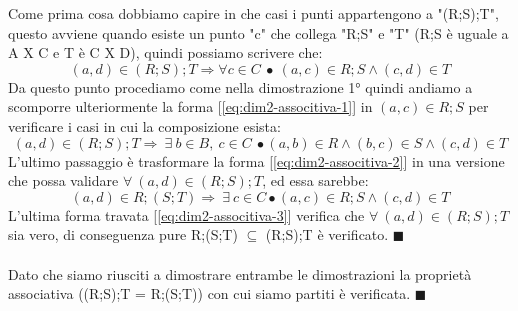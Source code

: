 \begin{demostration}
        Come prima cosa dobbiamo capire in che casi i punti appartengono a "(R;S);T", questo avviene quando esiste un punto "c" che collega "R;S" e "T" (R;S è uguale a A X C e T è C X D), quindi possiamo scrivere che:
        \begin{equation}
            (a,d) \in (R;S);T \Longrightarrow \forall c \in C \: \bullet \: (a,c) \in R;S \land (c,d) \in T
            \label{eq:dim2-associtiva-1}
        \end{equation}
        Da questo punto procediamo come nella dimostrazione 1° quindi andiamo a scomporre ulteriormente la forma [\ref{eq:dim2-associtiva-1}] in $(a,c) \in R;S$ per verificare i casi in cui la composizione esista:
        \begin{equation}
            (a,d) \in (R;S);T \Longrightarrow \: \exists \: b \in B, \: c \in C \: \bullet (a,b) \in R \land (b,c) \in S \land (c,d) \in T
            \label{eq:dim2-associtiva-2}
        \end{equation}
        L'ultimo passaggio è trasformare la forma [\ref{eq:dim2-associtiva-2}] in una versione che possa validare $\forall \: (a,d) \in (R;S);T$, ed essa sarebbe:
        \begin{equation}
            (a,d) \in R;(S;T) \Longrightarrow \: \exists \: c \in C \bullet (a,c) \in R;S \land (c,d) \in T
            \label{eq:dim2-associtiva-3}
        \end{equation}
        L'ultima forma travata [\ref{eq:dim2-associtiva-3}] verifica che $\forall \: (a,d) \in (R;S);T$ sia vero, di conseguenza pure R;(S;T) $\subseteq$ (R;S);T è verificato. $\blacksquare$\\ \\
        Dato che siamo riusciti a dimostrare entrambe le dimostrazioni la proprietà associativa ((R;S);T = R;(S;T)) con cui siamo partiti è verificata. $\blacksquare$
\end{demostration}



